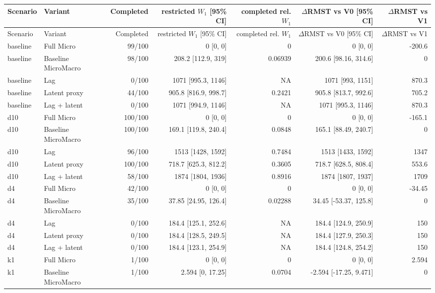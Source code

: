 \begin{landscape}
\scriptsize
\begin{longtable}{llrrrrr}
\toprule
Scenario & Variant & Completed & restricted $W_1$ [95\% CI] & completed rel. $W_1$ & $\Delta$RMST vs V0 [95\% CI] & $\Delta$RMST vs V1 \\
\midrule
\endfirsthead
\toprule
Scenario & Variant & Completed & restricted $W_1$ [95\% CI] & completed rel. $W_1$ & $\Delta$RMST vs V0 [95\% CI] & $\Delta$RMST vs V1 \\
\midrule
\endhead
baseline & Full Micro & 99/100 & 0 [0, 0] & 0 & 0 [0, 0] & -200.6 \\
baseline & Baseline MicroMacro & 98/100 & 208.2 [112.9, 319] & 0.06939 & 200.6 [98.16, 314.6] & 0 \\
baseline & Lag & 0/100 & 1071 [995.3, 1146] & NA & 1071 [993, 1151] & 870.3 \\
baseline & Latent proxy & 44/100 & 905.8 [816.9, 998.7] & 0.2421 & 905.8 [813.7, 992.6] & 705.2 \\
baseline & Lag + latent & 0/100 & 1071 [994.9, 1146] & NA & 1071 [995.3, 1146] & 870.3 \\
d10 & Full Micro & 100/100 & 0 [0, 0] & 0 & 0 [0, 0] & -165.1 \\
d10 & Baseline MicroMacro & 100/100 & 169.1 [119.8, 240.4] & 0.0848 & 165.1 [88.49, 240.7] & 0 \\
d10 & Lag & 96/100 & 1513 [1428, 1592] & 0.7484 & 1513 [1433, 1592] & 1347 \\
d10 & Latent proxy & 100/100 & 718.7 [625.3, 812.2] & 0.3605 & 718.7 [628.5, 808.4] & 553.6 \\
d10 & Lag + latent & 58/100 & 1874 [1804, 1936] & 0.8916 & 1874 [1807, 1937] & 1709 \\
d4 & Full Micro & 42/100 & 0 [0, 0] & 0 & 0 [0, 0] & -34.45 \\
d4 & Baseline MicroMacro & 35/100 & 37.85 [24.95, 126.4] & 0.02288 & 34.45 [-53.37, 125.8] & 0 \\
d4 & Lag & 0/100 & 184.4 [125.1, 252.6] & NA & 184.4 [124.9, 250.9] & 150 \\
d4 & Latent proxy & 0/100 & 184.4 [128.5, 249.5] & NA & 184.4 [127.9, 250.3] & 150 \\
d4 & Lag + latent & 0/100 & 184.4 [123.1, 254.9] & NA & 184.4 [124.8, 254.2] & 150 \\
k1 & Full Micro & 1/100 & 0 [0, 0] & 0 & 0 [0, 0] & 2.594 \\
k1 & Baseline MicroMacro & 1/100 & 2.594 [0, 17.25] & 0.0704 & -2.594 [-17.25, 9.471] & 0 \\

\end{longtable}
\end{landscape}
